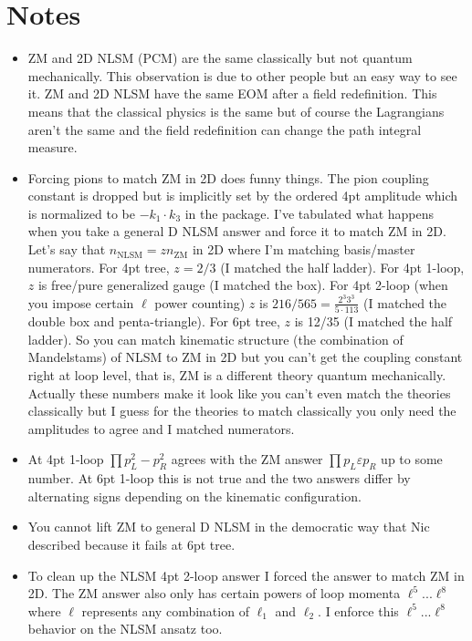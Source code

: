 \documentclass[12pt,letter]{article}
\def\eps{\varepsilon}
\begin{document}
\section{Notes}\label{sec:Notes}

\begin{itemize}
\item ZM and 2D NLSM (PCM) are the same classically but not quantum mechanically.
This observation is due to other people but an easy way to see it.
ZM and 2D NLSM have the same EOM after a field redefinition.
This means that the classical physics is the same but of course the Lagrangians aren't the same and the field redefinition can change the path integral measure.
\item Forcing pions to match ZM in 2D does funny things.
The pion coupling constant is dropped but is implicitly set by the ordered 4pt amplitude which is normalized to be $-k_1 \cdot k_3$ in the package.
I've tabulated what happens when you take a general D NLSM answer and force it to match ZM in 2D.
Let's say that $n_\text{NLSM} = z n_\text{ZM}$ in 2D where I'm matching basis/master numerators.
For 4pt tree, $z=2/3$ (I matched the half ladder).
For 4pt 1-loop, $z$ is free/pure generalized gauge (I matched the box).
For 4pt 2-loop (when you impose certain $\ell$ power counting) $z$ is $216/565=\tfrac{2^3 3^3}{5 \cdot 113}$ (I matched the double box and penta-triangle).
For 6pt tree, $z$ is 12/35 (I matched the half ladder).
So you can match kinematic structure (the combination of Mandelstams) of NLSM to ZM in 2D but you can't get the coupling constant right at loop level, that is, ZM is a different theory quantum mechanically.
Actually these numbers make it look like you can't even match the theories classically but I guess for the theories to match classically you only need the amplitudes to agree and I matched numerators.
\item At 4pt 1-loop $\prod p_L^2 -p_R^2$ agrees with the ZM answer $\prod p_L \eps p_R$ up to some number.
At 6pt 1-loop this is not true and the two answers differ by alternating signs depending on the kinematic configuration.
\item You cannot lift ZM to general D NLSM in the democratic way that Nic described because it fails at 6pt tree.
\item To clean up the NLSM 4pt 2-loop answer I forced the answer to match ZM in 2D.
The ZM answer also only has certain powers of loop momenta $\ell^5$...$\ell^8$ where $\ell$ represents any combination of $\ell_1$ and $\ell_2$.
I enforce this $\ell^5$...$\ell^8$ behavior on the NLSM ansatz too.
\end{itemize}
\end{document}
